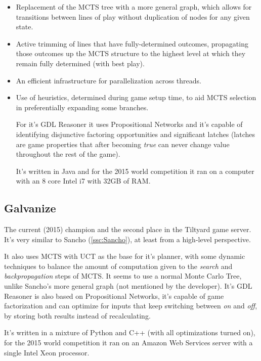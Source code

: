 \begin{itemize}

\item Replacement of the MCTS tree with a more general graph, which allows for transitions between lines of play without duplication of nodes for any given state.

\item Active trimming of lines that have fully-determined outcomes, propagating those outcomes up the MCTS structure to the highest level at which they remain fully determined (with best play).

\item An efficient infrastructure for parallelization across threads.

\item Use of heuristics, determined during game setup time, to aid MCTS selection in preferentially expanding some branches.

For it's \gls{GDL} Reasoner it uses Propositional Networks and it's capable of identifying disjunctive factoring opportunities and significant latches (latches are game properties that after becoming \textit{true} can never change value throughout the rest of the game).

It's written in Java and for the 2015 world competition it ran on a computer with an 8 core Intel i7 with 32GB of RAM.

\end{itemize}


\subsection{Galvanize}
The current (2015) champion and the second place in the Tiltyard game server.
It's very similar to Sancho (\ref{ssc:Sancho}), at least from a high-level perspective. 

It also uses \gls{MCTS} with \gls{UCT} as the base for it's planner, with some dynamic techniques to balance the amount of computation given to the \textit{search} and \textit{backpropagation} steps of \gls{MCTS}. It seems to use a normal Monte Carlo Tree, unlike Sancho's more general graph (not mentioned by the developer). 
It's GDL Reasoner is also based on Propositional Networks, it's capable of game factorization and can optimize for inputs that keep switching between \textit{on} and \textit{off}, by storing both results instead of recalculating.

It's written in a mixture of Python and C++ (with all optimizations turned on), for the 2015 world competition it ran on an Amazon Web Services server with a single Intel Xeon processor. 


